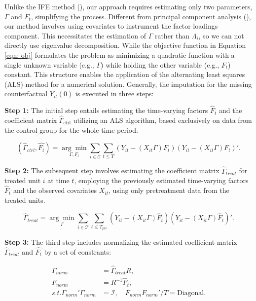 \documentclass[12pt]{article}
\begin{document}
Unlike the IFE method (\cite{bai2009panel,xu2017generalized}), our approach requires estimating only two parameters, $\Gamma$ and $F_t$, simplifying the process. Different from principal component analysis (\cite{jolliffe2002principal,stock2002forecasting}), our method involves using covariates to instrument the factor loadings component. This necessitates the estimation of $\Gamma$ rather than $\Lambda_i$, so we can not directly use eigenvalue decomposition. While the objective function in Equation \ref{eqn: obj} formulates the problem as minimizing a quadratic function with a single unknown variable (e.g., $\Gamma$) while holding the other variable (e.g., $F_t$) constant. This structure enables the application of the alternating least squares (ALS) method for a numerical solution. Generally, the imputation for the missing counterfactual $Y_{it}(0)$ is executed in three steps:

\textbf{Step 1:} The initial step entails estimating the time-varying factors $\hat{F}_t$ and the coefficient matrix $\hat{\Gamma}_{\text{ctrl}}$ utilizing an ALS algorithm, based exclusively on data from the control group for the whole time period.

\begin{equation}
(\hat{\Gamma}_{ctrl}, \hat{F_t}) = \underset{\Gamma, F_t}{\arg\min} \sum_{i \in \mathcal{C}} \sum_{t \leq T}\left( Y_{it} - (X_{it}\Gamma) F_{t} \right)\left( Y_{it} - (X_{it}\Gamma) F_{t} \right)'.
\label{eq: optimization}
\end{equation}

\textbf{Step 2:} The subsequent step involves estimating the coefficient matrix $\hat{\Gamma}_{treat}$ for treated unit $i$ at time $t$, employing the previously estimated time-varying factors $\hat{F}_t$ and the observed covariates $X_{it}$, using only pretreatment data from the treated units.

\begin{equation}
\hat{\Gamma}_{treat} = \underset{\Gamma}{\arg\min} \sum_{i \in \mathcal{T}} \sum_{t \leq T_{pre}} \left( Y_{it} - (X_{it} \Gamma) \hat{F}_{t} \right) \left( Y_{it} - (X_{it} \Gamma) \hat{F}_{t} \right)'.
\end{equation}

\textbf{Step 3:} The third step includes normalizing the estimated coefficient matrix $\hat{\Gamma}_{treat}$ and $\hat{F_t}$ by a set of constrants:

\begin{equation}
\begin{aligned}
\Gamma_{norm} &= \hat{\Gamma}_{treat} R, \\
F_{norm} &= R^{-1} \hat{F}_t, \\
s.t. \Gamma_{norm}'\Gamma_{norm} &= \mathcal{I}, \quad F_{norm} F_{norm}'/T = \text{Diagonal}.
\end{aligned}
\end{equation}
\end{document}
